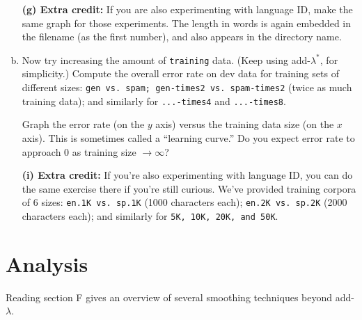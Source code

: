\documentclass[12pt]{article}
\theoremstyle{plain}
\theoremstyle{definition}
\theoremstyle{remark}
\begin{document}
\begin{enumerate}[(a)]
\item[\textbf{(g) Extra credit:}] If you are also experimenting with language ID, make the same graph for those experiments. The length in words is again embedded in the filename (as the first number), and also appears in the directory name.

\item Now try increasing the amount of \texttt{training} data. (Keep using add-$\lambda^*$, for simplicity.) Compute the overall error rate on dev data for training sets of different sizes: \texttt{gen vs. spam; gen-times2 vs. spam-times2} (twice as much training data); and similarly for \texttt{...-times4} and \texttt{...-times8}.

Graph the error rate (on the $y$ axis) versus the training data size (on the $x$ axis). This is sometimes called a “learning curve.” Do you expect error rate to approach 0 as training size $\rightarrow \infty$?

\item[\textbf{(i) Extra credit:}] If you’re also experimenting with language ID, you can do the same exercise there if you’re still curious. We’ve provided training corpora of 6 sizes: \texttt{en.1K vs. sp.1K} (1000 characters each); \texttt{en.2K vs. sp.2K} (2000 characters each); and similarly for \texttt{5K, 10K, 20K, and 50K}.
\end{enumerate}

\section{Analysis}

Reading section F gives an overview of several smoothing techniques beyond add-$\lambda$.
\end{document}

